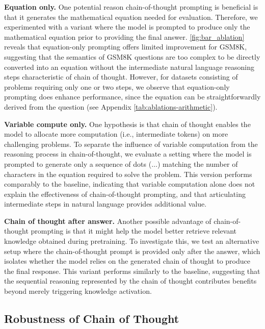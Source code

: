 \textbf{Equation only.} One potential reason chain-of-thought prompting is beneficial is that it generates the mathematical equation needed for evaluation. Therefore, we experimented with a variant where the model is prompted to produce only the mathematical equation prior to providing the final answer. \cref{fig:bar_ablation} reveals that equation-only prompting offers limited improvement for GSM8K, suggesting that the semantics of GSM8K questions are too complex to be directly converted into an equation without the intermediate natural language reasoning steps characteristic of chain of thought. However, for datasets consisting of problems requiring only one or two steps, we observe that equation-only prompting does enhance performance, since the equation can be straightforwardly derived from the question (see Appendix \cref{tab:ablations-arithmetic}).


\textbf{Variable compute only.} One hypothesis is that chain of thought enables the model to allocate more computation (i.e., intermediate tokens) on more challenging problems. To separate the influence of variable computation from the reasoning process in chain-of-thought, we evaluate a setting where the model is prompted to generate only a sequence of dots ($\ldots$) matching the number of characters in the equation required to solve the problem. This version performs comparably to the baseline, indicating that variable computation alone does not explain the effectiveness of chain-of-thought prompting, and that articulating intermediate steps in natural language provides additional value.

\textbf{Chain of thought after answer.} Another possible advantage of chain-of-thought prompting is that it might help the model better retrieve relevant knowledge obtained during pretraining. To investigate this, we test an alternative setup where the chain-of-thought prompt is provided only after the answer, which isolates whether the model relies on the generated chain of thought to produce the final response. This variant performs similarly to the baseline, suggesting that the sequential reasoning represented by the chain of thought contributes benefits beyond merely triggering knowledge activation.


\subsection{Robustness of Chain of Thought}\label{subsec:robustness}

